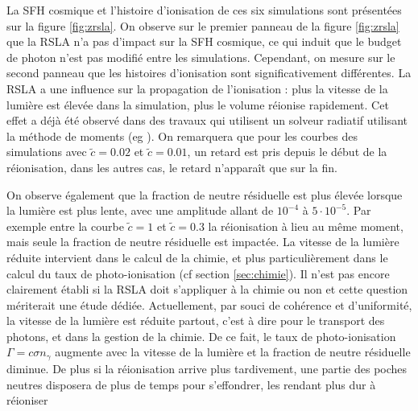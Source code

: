 La \ac{SFH} cosmique et l'histoire d'ionisation de ces six simulations sont présentées sur la figure \ref{fig:zrsla}.
On observe sur le premier panneau de la figure \ref{fig:zrsla} que la \ac{RSLA} n'a pas d'impact sur la \ac{SFH} cosmique, ce qui induit que le budget de photon n'est pas modifié entre les simulations.
Cependant, on mesure sur le second panneau que les histoires d'ionisation sont significativement différentes.%
La \ac{RSLA} a une influence sur la propagation de l'ionisation : plus la vitesse de la lumière est élevée dans la simulation, plus le volume réionise rapidement.
Cet effet a déjà été observé dans des travaux qui utilisent un solveur radiatif utilisant la méthode de moments (eg \cite{rosdahl_ramsesrt_2013}).
On remarquera que pour les courbes des simulations avec $\tilde{c}=0.02$ et $\tilde{c}=0.01$, un retard est pris depuis le début de la réionisation, dans les autres cas, le retard n’apparaît que sur la fin.

On observe également que la fraction de neutre résiduelle est plus élevée lorsque la lumière est plus lente, avec une amplitude allant de $10^{-4}$ à $5 \cdot 10 ^{-5}$.
Par exemple entre la courbe $\tilde{c}=1$ et $\tilde{c}=0.3$ la réionisation à lieu au même moment, mais seule la fraction de neutre résiduelle est impactée.
La vitesse de la lumière réduite intervient dans le calcul de la chimie, et plus particulièrement dans le calcul du taux de photo-ionisation (cf section \ref{sec:chimie}).
Il n'est pas encore clairement établi si la \ac{RSLA} doit s’appliquer à la chimie ou non et cette question mériterait une étude dédiée.
Actuellement, par souci de cohérence et d'uniformité, la vitesse de la lumière est réduite partout, c'est à dire pour le transport des photons, et dans la gestion de la chimie.
De ce fait, le taux de photo-ionisation $\Gamma = c \sigma n_\gamma$ augmente avec la vitesse de la lumière et la fraction de neutre résiduelle diminue.
De plus si la réionisation arrive plus tardivement, une partie des poches neutres disposera de plus de temps pour s'effondrer, les rendant plus dur à réioniser

